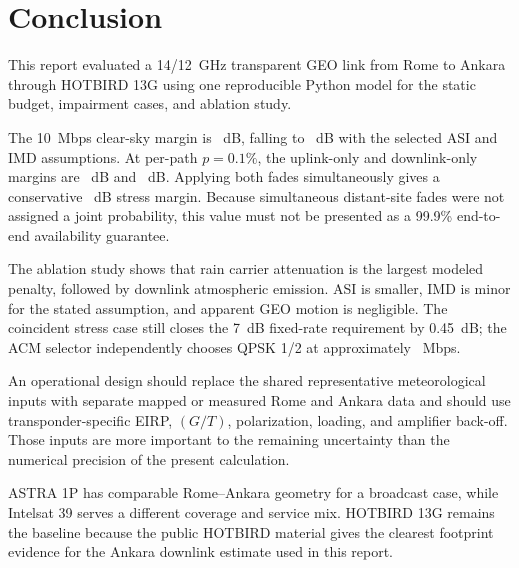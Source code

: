 
\section{Conclusion}

This report evaluated a 14/12~GHz transparent GEO link from Rome to Ankara through HOTBIRD 13G using one reproducible Python model for the static budget, impairment cases, and ablation study.

The 10~Mbps clear-sky margin is \marginClear~dB, falling to \marginASI~dB with the selected ASI and IMD assumptions. At per-path $p=0.1\%$, the uplink-only and downlink-only margins are \marginUplinkFade~dB and \marginDownlinkFade~dB. Applying both fades simultaneously gives a conservative \marginRain~dB stress margin. Because simultaneous distant-site fades were not assigned a joint probability, this value must not be presented as a 99.9\% end-to-end availability guarantee.

The ablation study shows that rain carrier attenuation is the largest modeled penalty, followed by downlink atmospheric emission. ASI is smaller, IMD is minor for the stated assumption, and apparent GEO motion is negligible. The coincident stress case still closes the 7~dB fixed-rate requirement by 0.45~dB; the ACM selector independently chooses QPSK 1/2 at approximately \throughputRain~Mbps.

An operational design should replace the shared representative meteorological inputs with separate mapped or measured Rome and Ankara data and should use transponder-specific EIRP, $(G/T)$, polarization, loading, and amplifier back-off. Those inputs are more important to the remaining uncertainty than the numerical precision of the present calculation.

ASTRA 1P has comparable Rome--Ankara geometry for a broadcast case, while Intelsat 39 serves a different coverage and service mix. HOTBIRD 13G remains the baseline because the public HOTBIRD material gives the clearest footprint evidence for the Ankara downlink estimate used in this report.
